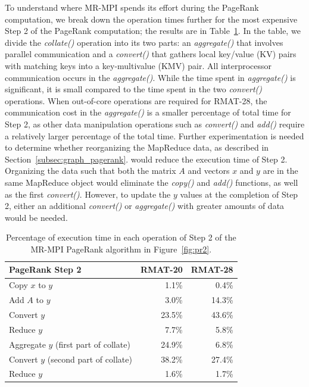 To understand where MR-MPI spends its effort during the PageRank
computation, we break down the operation times further for the most
expensive Step 2 of the PageRank computation; the results are in
Table~\ref{table:prdetail2}.  In the table, we divide the {\it
collate()} operation into its two parts: an {\it aggregate()} that
involves parallel communication and a {\it convert()} that gathers
local key/value (KV) pairs with matching keys into a key-multivalue
(KMV) pair.  All interprocessor communication occurs in the {\it
aggregate()}.  While the time spent in {\it aggregate()} is
significant, it is small compared to the time spent in the two {\it
convert()} operations.  When out-of-core operations are required for
RMAT-28, the communication cost in the {\it aggregate()} is a smaller
percentage of total time for Step 2, as other data manipulation
operations such as {\it convert()} and {\it add()} require a
relatively larger percentage of the total time.  Further
experimentation is needed to determine whether reorganizing the
MapReduce data, as described in Section~\ref{subsec:graph_pagerank}.
would reduce the execution time of Step 2.  Organizing the data such
that both the matrix $A$ and vectors $x$ and $y$ are in the same
MapReduce object would eliminate the {\it copy()} and {\it add()}
functions, as well as the first {\it convert()}.  However, to update
the $y$ values at the completion of Step 2, either an additional {\it
convert()} or {\it aggregate()} with greater amounts of data would be
needed.

\begin{table}[htb]
\begin{center}
\begin{tabular}{|l|r|r|}
\hline 
PageRank Step 2 & RMAT-20 & RMAT-28 \\
\hline
Copy $x$ to $y$                       &  1.1\% &  0.4\%\\
Add $A$ to $y$                        &  3.0\% & 14.3\% \\
Convert $y$                           & 23.5\% & 43.6\% \\
Reduce $y$                            &  7.7\% &  5.8\% \\
Aggregate $y$ (first part of collate) & 24.9\% &  6.8\% \\
Convert $y$ (second part of collate)  & 38.2\% & 27.4\% \\
Reduce $y$                            &  1.6\% &  1.7\% \\
\hline
\end{tabular}
\caption{Percentage of execution time in each operation of Step 2 of the MR-MPI 
PageRank algorithm in Figure~\ref{fig:pr2}.}
\label{table:prdetail2}
\end{center}
\end{table}

